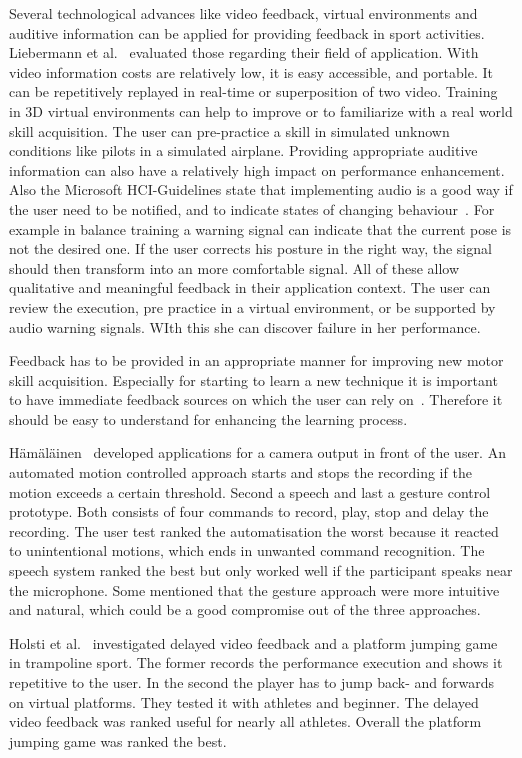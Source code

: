 Several technological advances like video feedback, virtual environments and auditive information can be applied for providing feedback in sport activities. Liebermann et al.~\cite{Liebermann2002-zr} evaluated those regarding their field of application. With video information costs are relatively low, it is easy accessible, and portable. It can be repetitively replayed in real-time or superposition of two video. Training in 3D virtual environments can help to improve or to familiarize with a real world skill acquisition. The user can pre-practice a skill in simulated unknown conditions like pilots in a simulated airplane. Providing appropriate auditive information can also have a relatively high impact on performance enhancement. Also the Microsoft HCI-Guidelines state that implementing audio is a good way if the user need to be notified, and to indicate states of changing behaviour~\cite{MicrosoftHIG2014-mh}. For example in balance training a warning signal can indicate that the current pose is not the desired one. If the user corrects his posture in the right way, the signal should then transform into an more comfortable signal. All of these allow qualitative and meaningful feedback in their application context. The user can review the execution, pre practice in a virtual environment, or be supported by audio warning signals. WIth this she can discover failure in her performance.

Feedback has to be provided in an appropriate manner for improving new motor skill acquisition. Especially for starting to learn a new technique it is important to have immediate feedback sources on which the user can rely on~\cite{Hodges2002-gb, Winstein1990-to}. Therefore it should be easy to understand for enhancing the learning process. 

Hämäläinen~\cite{Hmlinen2004-ai} developed applications for a camera output in front of the user. An automated motion controlled approach starts and stops the recording if the motion exceeds a certain threshold. Second a speech and last a gesture control prototype. Both consists of four commands to record, play, stop and delay the recording. The user test ranked the automatisation the worst because it reacted to unintentional motions, which ends in unwanted command recognition. The speech system ranked the best but only worked well if the participant speaks near the microphone. Some mentioned that the gesture approach were more intuitive and natural, which could be a good compromise out of the three approaches.

Holsti et al.~\cite{Holsti2013-kn} investigated delayed video feedback and a platform jumping game in trampoline sport. The former records the performance execution and shows it repetitive to the user. In the second the player has to jump back- and forwards on virtual platforms. They tested it with athletes and beginner. The delayed video feedback was ranked useful for nearly all athletes. Overall the platform jumping game was ranked the best.

